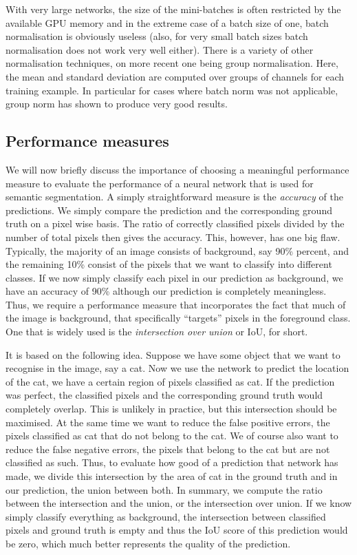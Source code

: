 With very large networks, the size of the mini-batches is often restricted by
the available GPU memory and in the extreme case of a batch size of one, batch
normalisation is obviously useless (also, for very small batch sizes batch
normalisation does not work very well either). There is a variety of other
normalisation techniques, on more recent one being group normalisation. Here,
the mean and standard deviation are computed over groups of channels for each
training example. In particular for cases where batch norm was not applicable,
group norm has shown to produce very good results.

\subsection*{Performance measures}
We will now briefly discuss the importance of choosing a meaningful performance
measure to evaluate the performance of a neural network that is used for
semantic segmentation. A simply straightforward measure is the \emph{accuracy}
of the predictions. We simply compare the prediction and the corresponding
ground truth on a pixel wise basis.  The ratio of correctly classified pixels
divided by the number of total pixels then gives the accuracy. This, however,
has one big flaw. Typically, the majority of an image consists of background,
say 90\% percent, and the remaining 10\% consist of the pixels that we want to
classify into different classes. If we now simply classify each pixel in our
prediction as background, we have an accuracy of 90\% although our prediction is
completely meaningless. Thus, we require a performance measure that incorporates
the fact that much of the image is background, \ie that specifically ``targets''
pixels in the foreground class. One that is widely used is the
\emph{intersection over union} or IoU, for short.

It is based on the following idea. Suppose we have some object that we want to
recognise in the image, say a cat. Now we use the network to predict the
location of the cat, \ie we have a certain region of pixels classified as cat.
If the prediction was perfect, the classified pixels and the corresponding
ground truth would completely overlap. This is unlikely in practice, but this
intersection should be maximised. At the same time we want to reduce the false
positive errors, \ie the pixels classified as cat that do not belong to the cat.
We of course also want to reduce the false negative errors, \ie the pixels that
belong to the cat but are not classified as such. Thus, to evaluate how good of
a prediction that network has made, we divide this intersection by the area of
cat in the ground truth and in our prediction, \ie the union between both. In
summary, we compute the ratio between the intersection and the union, or the
intersection over union. If we know simply classify everything as background,
the intersection between classified pixels and ground truth is empty and thus
the IoU score of this prediction would be zero, which much better represents the
quality of the prediction.

